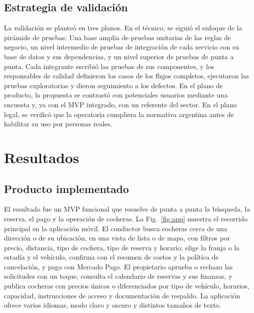 \documentclass[conference,a4paper]{IEEEtran}
\begin{document}
\subsection{Estrategia de validación}

La validación se planteó en tres planos. En el técnico, se siguió el enfoque de la pirámide de pruebas: Una base amplia de pruebas unitarias de las reglas de negocio, un nivel intermedio de pruebas de integración de cada servicio con su base de datos y sus dependencias, y un nivel superior de pruebas de punta a punta. Cada integrante escribió las pruebas de sus componentes, y los responsables de calidad definieron los casos de los flujos completos, ejecutaron las pruebas exploratorias y dieron seguimiento a los defectos. En el plano de producto, la propuesta se contrastó con potenciales usuarios mediante una encuesta y, ya con el MVP integrado, con un referente del sector. En el plano legal, se verificó que la operatoria cumpliera la normativa argentina antes de habilitar su uso por personas reales.

\section{Resultados}\label{sec:resultados}

\subsection{Producto implementado}

El resultado fue un MVP funcional que resuelve de punta a punta la búsqueda, la reserva, el pago y la operación de cocheras. La Fig.~\ref{fig:app} muestra el recorrido principal en la aplicación móvil. El conductor busca cocheras cerca de una dirección o de su ubicación, en una vista de lista o de mapa, con filtros por precio, distancia, tipo de cochera, tipo de reserva y horario; elige la franja o la estadía y el vehículo, confirma con el resumen de costos y la política de cancelación, y paga con Mercado Pago. El propietario aprueba o rechaza las solicitudes con un toque, consulta el calendario de reservas y sus finanzas, y publica cocheras con precios únicos o diferenciados por tipo de vehículo, horarios, capacidad, instrucciones de acceso y documentación de respaldo. La aplicación ofrece varios idiomas, modo claro y oscuro y distintos tamaños de texto.
\end{document}
